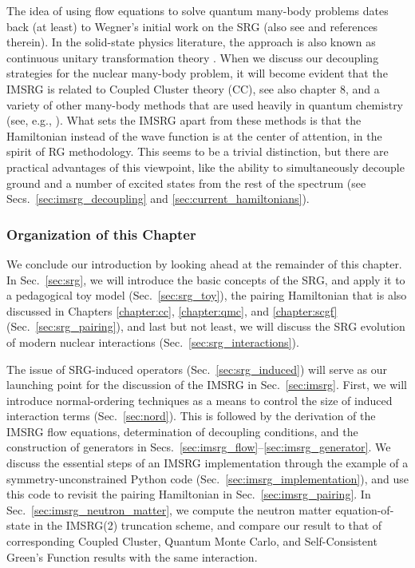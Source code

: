 {The idea of using flow equations to solve quantum many-body problems
dates back (at least) to Wegner's initial work on the SRG \cite{Wegner:1994dk} 
(also see \cite{Kehrein:2006kx} and references therein). In the 
solid-state physics literature, the approach is also known as 
continuous unitary transformation theory  
\cite{Heidbrink:2002kx,Drescher:2011kx,Krull:2012bs,Fauseweh:2013zv,Krones:2015ft}.
When we discuss our decoupling strategies for the nuclear many-body
problem, it will become evident that the IMSRG is related to Coupled Cluster theory (CC), see also chapter 8,  
and a variety of other many-body methods that are used heavily in 
quantum chemistry (see, e.g., \cite{Shavitt:2009,Hagen:2014ve,White:2002fk,
Yanai:2007kx,Nakatsuji:1976yq,Mukherjee:2001uq,Mazziotti:2006fk,Evangelista:2014rq}).
What sets the IMSRG apart from these methods is that the Hamiltonian 
instead of the wave function is at the center of attention, in the
spirit of RG methodology. This seems to be a trivial distinction, but
there are practical advantages of this viewpoint, like the ability to
simultaneously decouple ground and a number of excited states from the
rest of the spectrum (see Secs.~\ref{sec:imsrg_decoupling} and 
\ref{sec:current_hamiltonians}). 


%
%
\subsubsection*{Organization of this Chapter}
We conclude our introduction by looking ahead at the remainder of this
chapter. In Sec.~\ref{sec:srg}, we will introduce the basic concepts of
the SRG, and apply it to a pedagogical toy model
(Sec.~\ref{sec:srg_toy}), the pairing Hamiltonian that is also discussed 
in Chapters \ref{chapter:cc}, \ref{chapter:qmc}, and \ref{chapter:scgf} 
(Sec.~\ref{sec:srg_pairing}), and last but not least, we will discuss the 
SRG evolution of modern nuclear interactions (Sec.~\ref{sec:srg_interactions}). 

The issue of SRG-induced operators (Sec.~\ref{sec:srg_induced}) will serve 
as our launching point for the discussion of the IMSRG in Sec.~\ref{sec:imsrg}.
First, we will introduce normal-ordering techniques as a means to control the 
size of induced interaction terms (Sec.~\ref{sec:nord}). This is followed
by the derivation of the IMSRG flow equations, determination of decoupling
conditions, and the construction of generators in Secs.~\ref{sec:imsrg_flow}--\ref{sec:imsrg_generator}.
We discuss the essential steps of an IMSRG implementation through the 
example of a symmetry-unconstrained Python code (Sec.~\ref{sec:imsrg_implementation}), 
and use this code to revisit the pairing Hamiltonian in Sec.~\ref{sec:imsrg_pairing}.
In Sec.~\ref{sec:imsrg_neutron_matter}, we compute the neutron matter 
equation-of-state in the IMSRG(2) truncation scheme, and compare our result
to that of corresponding Coupled Cluster, Quantum Monte Carlo, and Self-Consistent 
Green's Function results with the same interaction. 

}

